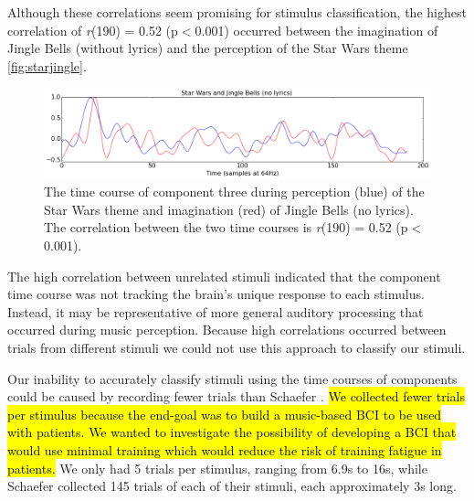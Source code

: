 Although these correlations seem promising for stimulus classification, the highest correlation of \textit{r}(190) = 0.52 (p$<$0.001) occurred between the imagination of Jingle Bells (without lyrics) and the perception of the Star Wars theme \autoref{fig:starjingle}.
\begin{figure}[htbp]
  \centerline{\includegraphics[scale=0.4]{Figures/TimeCourse-StarJingle}}
  \caption{The time course of component three during perception (blue) of the Star Wars theme and imagination (red) of Jingle Bells (no lyrics). The correlation between the two time courses is \textit{r}(190) = 0.52 (p$<$0.001).}
  \label{fig:starjingle}
\end{figure}
The high correlation between unrelated stimuli indicated that the component time course was not tracking the brain's unique response to each stimulus. 
Instead, it may be representative of more general auditory processing that occurred during music perception.
Because high correlations occurred between trials from different stimuli we could not use this approach to classify our stimuli.

Our inability to accurately classify stimuli using the time courses of components could be caused by recording fewer trials than Schaefer \etal \citeyear{schaefer_name_2011}.
\hl{We collected fewer trials per stimulus because the end-goal was to build a music-based BCI to be used with patients. 
We wanted to investigate the possibility of developing a BCI that would use minimal training which would reduce the risk of training fatigue in patients. }
We only had 5 trials per stimulus, ranging from 6.9s to 16s, while Schaefer \etal \citeyear{schaefer_name_2011} collected 145 trials of each of their stimuli, each approximately 3s long.